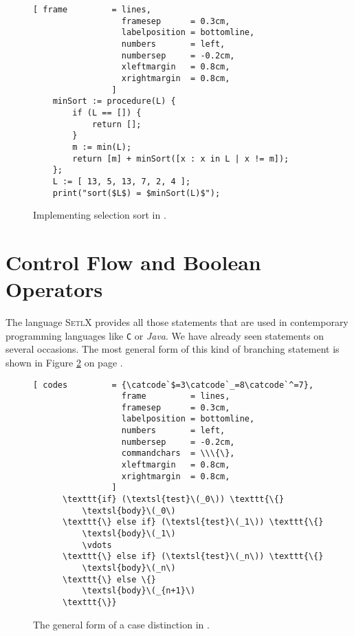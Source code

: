 \begin{figure}[!ht]
\centering
\begin{Verbatim}[ frame         = lines, 
                  framesep      = 0.3cm, 
                  labelposition = bottomline,
                  numbers       = left,
                  numbersep     = -0.2cm,
                  xleftmargin   = 0.8cm,
                  xrightmargin  = 0.8cm,
                ]
    minSort := procedure(L) {
        if (L == []) {
            return [];
        }
        m := min(L);
        return [m] + minSort([x : x in L | x != m]);
    };   
    L := [ 13, 5, 13, 7, 2, 4 ];
    print("sort($L$) = $minSort(L)$");
\end{Verbatim}
\vspace*{-0.3cm}
\caption{Implementing selection sort in \setlx.}
\label{fig:min-sort.stlx}
\end{figure}

\section{Control Flow and Boolean Operators}
The language \textsc{SetlX} provides all those  statements that are used in
contemporary programming languages like \texttt{C} or \textsl{Java}.  We have already seen 
statements on several occasions.  The most general form of this kind of branching statement is shown
in Figure \ref{fig:if} on page \pageref{fig:if}.
\begin{figure}[!ht]
\begin{Verbatim}[ codes         = {\catcode`$=3\catcode`_=8\catcode`^=7},
                  frame         = lines, 
                  framesep      = 0.3cm, 
                  labelposition = bottomline,
                  numbers       = left,
                  numbersep     = -0.2cm,
                  commandchars  = \\\{\},
                  xleftmargin   = 0.8cm,
                  xrightmargin  = 0.8cm,
                ]
      \texttt{if} (\textsl{test}\(_0\)) \texttt{\{}
          \textsl{body}\(_0\)
      \texttt{\} else if} (\textsl{test}\(_1\)) \texttt{\{}
          \textsl{body}\(_1\)
          \vdots
      \texttt{\} else if} (\textsl{test}\(_n\)) \texttt{\{}
          \textsl{body}\(_n\)
      \texttt{\} else \{}
          \textsl{body}\(_{n+1}\)
      \texttt{\}}
\end{Verbatim} 
\vspace*{-0.3cm}
\caption{The general form of a case distinction in \setlx.}  
\label{fig:if}
\end{figure}%


